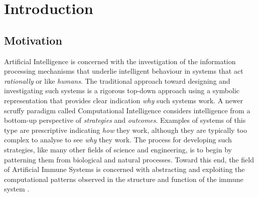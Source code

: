 
%
%




%
%
\chapter{Introduction}
\label{chap:introduction}

%
%
\section{Motivation}
\label{sec:intro:motivation}
Artificial Intelligence is concerned with the investigation of the information processing mechanisms that underlie intelligent behaviour in systems that act \emph{rationally} or like \emph{humans}. The traditional approach toward designing and investigating such systems is a rigorous top-down approach using a symbolic representation that provides clear indication \emph{why} such systems work. A newer scruffy paradigm called Computational Intelligence considers intelligence from a bottom-up perspective of \emph{strategies} and \emph{outcomes}. Examples of systems of this type are prescriptive indicating \emph{how} they work, although they are typically too complex to analyse to see \emph{why} they work. The process for developing such strategies, like many other fields of science and engineering, is to begin by patterning them from biological and natural processes. Toward this end, the field of Artificial Immune Systems is concerned with abstracting and exploiting the computational patterns observed in the structure and function of the immune system \cite{Castro2002a}.

